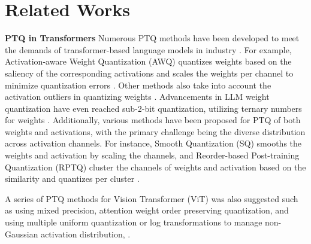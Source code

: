 \section{Related Works}
\label{sec:rw}
\textbf{PTQ in Transformers}
Numerous PTQ methods have been developed to meet the demands of transformer-based language models in industry \cite{zhao2023surveylargelanguagemodels}. For example, Activation-aware Weight Quantization (AWQ) quantizes weights based on the saliency of the corresponding activations and scales the weights per channel to minimize quantization errors \cite{lin2024awqactivationawareweightquantization}. Other methods also take into account the activation outliers in quantizing weights \cite{dettmers2023spqrsparsequantizedrepresentationnearlossless, lee2024owqoutlierawareweightquantization}.  Advancements in LLM weight quantization have even reached sub-2-bit quantization, utilizing ternary numbers for weights \cite{wang2023bitnetscaling1bittransformers, ma2024era1bitllmslarge}. Additionally, various methods have been proposed for PTQ of both weights and activations, with the primary challenge being the diverse distribution across activation channels. For instance, Smooth Quantization (SQ) smooths the weights and activation by scaling the channels, and Reorder-based Post-training Quantization (RPTQ) cluster the channels of weights and activation based on the similarity and quantizes per cluster \cite{xiao2024smoothquantaccurateefficientposttraining, yuan2023rptqreorderbasedposttrainingquantization}. 

A series of PTQ methods for Vision Transformer (ViT) was also suggested such as using mixed precision, attention weight order preserving quantization, and using multiple uniform quantization or log transformations to manage non-Gaussian activation distribution, \cite{liu2021posttraining, yuan2024ptq4vitposttrainingquantizationvision, lin2023fqvitposttrainingquantizationfully}.

